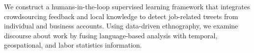 We construct a humans-in-the-loop supervised learning framework that integrates crowdsourcing feedback and local knowledge to detect job-related tweets from individual and business accounts. Using data-driven ethnography, we examine discourse about work by fusing language-based analysis with temporal, geospational, and labor statistics information.
